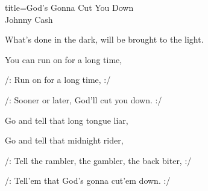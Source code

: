 \begin{song}{title=\centering God's Gonna Cut You Down \\\normalsize Johnny Cash \vspace*{-0.3cm}}
{What's done in the dark, will be brought to the light. 

\sloka
You can run on for a long time, 

/: Run on for a long time, :/ 

/: Sooner or later, God'll cut you down. :/ 

\sloka
Go and tell that long tongue liar, 

Go and tell that midnight rider, 

/: Tell the rambler, the gambler, the back biter, :/ 

/: Tell'em that God's gonna  cut'em down. :/ 

}
\setcounter{Slokočet}{0}
\end{song}

